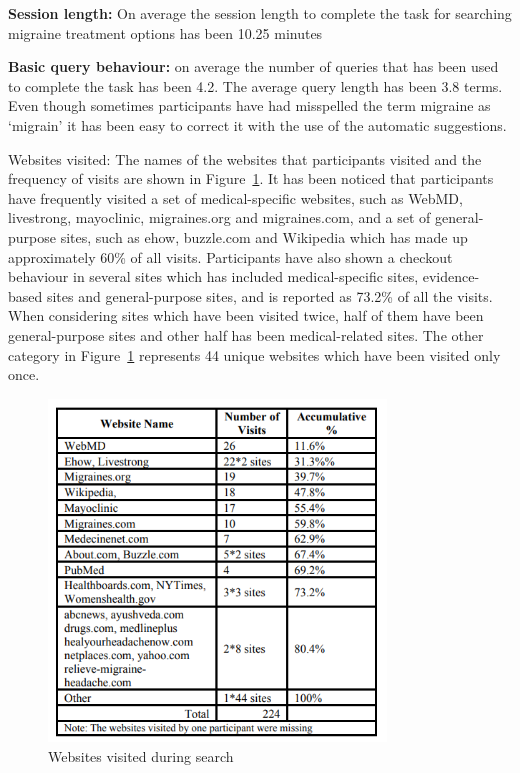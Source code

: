 \documentclass[]{article}
\begin{document}
\textbf{Session length:} On average the session length to complete the task for searching migraine treatment options has been 10.25 minutes

\textbf{Basic query behaviour:} on average the number of queries that has been used to complete the task has been 4.2. The average query length has been 3.8 terms. Even though sometimes participants have had misspelled the term migraine as ‘migrain’ it has been easy to correct it with the use of the automatic suggestions.

Websites visited: The names of the websites that participants visited and the frequency of visits are shown in Figure~\ref{fig3}. It has been noticed that participants have frequently visited a set of medical-specific websites, such as WebMD, livestrong, mayoclinic, migraines.org and migraines.com, and a set of general-purpose sites, such as ehow, buzzle.com and Wikipedia which has made up approximately 60\% of all visits. Participants have also shown a checkout behaviour in several sites which has included medical-specific sites, evidence-based sites and general-purpose sites, and is reported as 73.2\% of all the visits. When considering sites which have been visited twice, half of them have been general-purpose sites and other half has been medical-related sites. The other category in Figure~\ref{fig3} represents 44 unique websites which have been visited only once. 

\begin{figure}[t!]
	\includegraphics[width=0.8\textwidth]{Capture3.png}
	\caption{Websites visited during search \label{fig3}}
\end{figure}   
\end{document}
